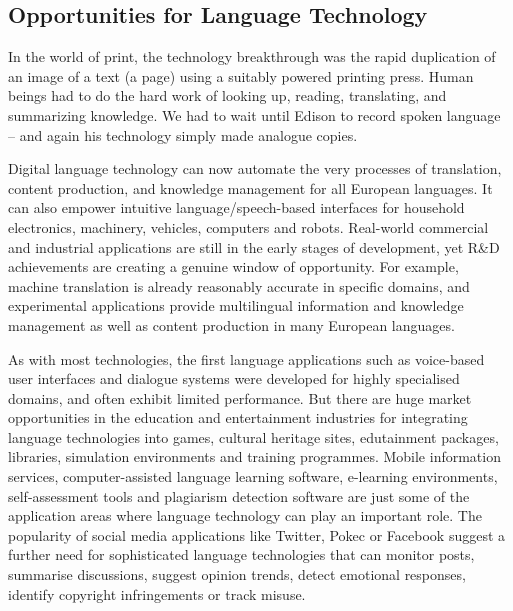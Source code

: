\begin{multicols}{2}
\subsection{Opportunities for Language Technology}
In the world of print, the technology breakthrough was the rapid
duplication of an image of a text (a page) using a suitably powered
printing press. Human beings had to do the hard work of looking up,
reading, translating, and summarizing knowledge. We had to wait until
Edison to record spoken language – and again his technology simply
made analogue copies.

Digital language technology can now automate the very processes of translation, content production, and knowledge management for all European languages. It can also empower intuitive language/speech-based interfaces for household electronics, machinery, vehicles, computers and robots. Real-world commercial and industrial applications are still in the early stages of development, yet R\&D achievements are creating a genuine window of opportunity. For example, machine translation is already reasonably accurate in specific domains, and experimental applications provide multilingual information and knowledge management as well as content production in many European languages. 

As with most technologies, the first language applications such as voice-based user interfaces and dialogue systems were developed for highly specialised domains, and often exhibit limited performance. But there are huge market opportunities in the education and entertainment industries for integrating language technologies into games, cultural heritage sites, edutainment packages, libraries, simulation environments and training programmes. Mobile information services, computer-assisted language learning software, e-learning environments, self-assessment tools and plagiarism detection software are just some of the application areas where language technology can play an important role. The popularity of social media applications like Twitter, Pokec or Facebook suggest a further need for sophisticated language technologies that can monitor posts, summarise discussions, suggest opinion trends, detect emotional responses, identify copyright infringements or track misuse.



\end{multicols}

